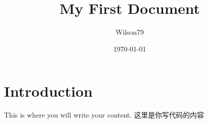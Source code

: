 \documentclass{article}
\title{My First Document}
\author{Wilson79}
\date{\today}
\begin{document}
 

	\section{Introduction} This is where you will write your content. 这里是你写代码的内容 
\end{document}
